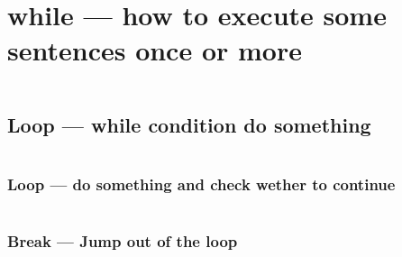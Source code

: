 \documentclass[
  11pt, %
  xcolor=dvipsnames
]{beamer}
\begin{document}
\section{while --- how to execute some sentences once or more}
\begin{frame}[fragile]

	\begin{columns}[c]
		\begin{column}{0.9\textwidth}


		\end{column}
	\end{columns}

\end{frame}

\subsection{Loop --- while condition do something}
\begin{frame}[fragile]

	\begin{columns}[c]
		\begin{column}{0.9\textwidth}


		\end{column}
	\end{columns}

\end{frame}

\subsubsection{Loop --- do something and check wether to continue}
\begin{frame}[fragile]

	\begin{columns}[c]
		\begin{column}{0.9\textwidth}


		\end{column}
	\end{columns}

\end{frame}

\subsubsection{Break --- Jump out of the loop}
\begin{frame}[fragile]

	\begin{columns}[c]
		\begin{column}{0.9\textwidth}


		\end{column}
	\end{columns}

\end{frame}
\end{document}
